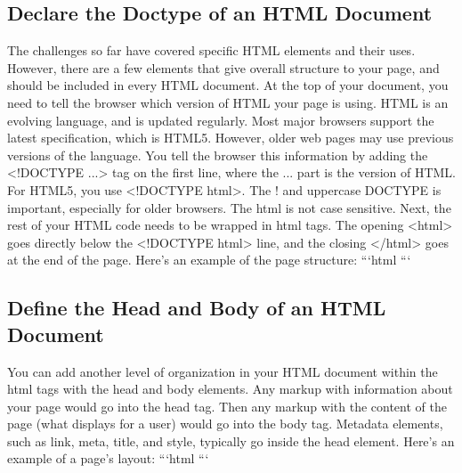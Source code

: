 \documentclass{article}%
\begin{document}
%
\subsection{Declare the Doctype of an HTML Document}%
\label{subsec:DeclaretheDoctypeofanHTMLDocument}%
The challenges so far have covered specific HTML elements and their uses. However, there are a few elements that give overall structure to your page, and should be included in every HTML document.\newline%
At the top of your document, you need to tell the browser which version of HTML your page is using. HTML is an evolving language, and is updated regularly. Most major browsers support the latest specification, which is HTML5. However, older web pages may use previous versions of the language.\newline%
You tell the browser this information by adding the <!DOCTYPE ...> tag on the first line, where the ... part is the version of HTML. For HTML5, you use <!DOCTYPE html>.\newline%
The ! and uppercase DOCTYPE is important, especially for older browsers. The html is not case sensitive.\newline%
Next, the rest of your HTML code needs to be wrapped in html tags. The opening <html> goes directly below the <!DOCTYPE html> line, and the closing </html> goes at the end of the page.\newline%
Here's an example of the page structure:\newline%
```html\newline%
\newline%
```\newline%

%
\subsection{Define the Head and Body of an HTML Document}%
\label{subsec:DefinetheHeadandBodyofanHTMLDocument}%
You can add another level of organization in your HTML document within the html tags with the head and body elements. Any markup with information about your page would go into the head tag. Then any markup with the content of the page (what displays for a user) would go into the body tag.\newline%
Metadata elements, such as link, meta, title, and style, typically go inside the head element.\newline%
Here's an example of a page's layout:\newline%
```html\newline%
\newline%
\newline%
```\newline%
\end{document}
